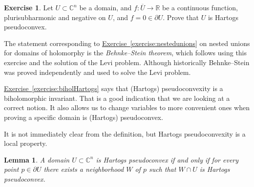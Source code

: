 \documentclass[12pt,openany]{book}
\newcommand{\C}{{\mathbb{C}}}
\newcommand{\R}{{\mathbb{R}}}
\newcommand{\myindex}[1]{#1\index{#1}}
\theoremstyle{plain}
\newtheorem{lemma}[thm]{Lemma}
\theoremstyle{remark}
\theoremstyle{definition}
\newenvironment{exbox}{%
    \def\FrameCommand{\vrule width 1pt \relax\hspace {10pt}}%
    \MakeFramed {\advance \hsize -\width \FrameRestore }%
}{%
    \endMakeFramed
}
\theoremstyle{exercise}
\newtheorem{exercise}{Exercise}[section]
\theoremstyle{example}
\newcommand{\exerciseref}[1]{\hyperref[#1]{Exercise~\ref*{#1}}}
\begin{document}
\begin{exbox}
\begin{exercise}
Let $U \subset \C^n$ be a domain, and $f \colon \overline{U} \to \R$ be a
continuous function, plurisubharmonic and negative on $U$, and $f=0 \in \partial
U$.  Prove that $U$ is Hartogs pseudoconvex.
\end{exercise}
\end{exbox}

The statement corresponding to \exerciseref{exercise:nestedunions} on nested unions
for domains of holomorphy is
the \emph{\myindex{Behnke--Stein theorem}}, which follows using this exercise and the solution
of the Levi problem.  Although historically Behnke--Stein was proved
independently and used to solve the Levi problem.

\exerciseref{exercise:biholHartogs} says that (Hartogs) pseudoconvexity is a
biholomorphic invariant.  That is a good indication that we are looking at a
correct notion.  It also allows us to change variables to more convenient
ones when proving a specific domain is (Hartogs) pseudoconvex.

It is not immediately clear from the definition, but Hartogs pseudoconvexity
is a local property.

\begin{lemma}
A domain $U \subset \C^n$ is Hartogs pseudoconvex if and only if
for every point $p \in \partial U$ there exists a neighborhood $W$ of $p$
such that $W \cap U$ is Hartogs pseudoconvex.
\end{lemma}
\end{document}
